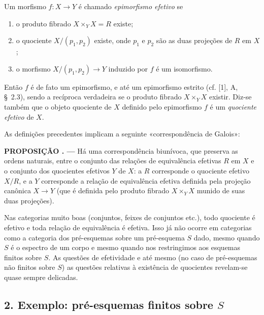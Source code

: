 \documentclass[11pt,twoside,openany]{book}
\numberwithin{equation}{section}
\newcommand{\src}[1]{%
  \phantomsection\hypertarget{src:#1}{}%
  \marginpar{\raggedleft\footnotesize\sffamily #1}%
}
\theoremstyle{plain}
\theoremstyle{definition}
\theoremstyle{remark}
\newcommand{\result}[2]{%
  \par\medskip\noindent\textbf{#1%
  \if\relax\detokenize{#2}\relax\else\space#2\fi. ---}\enspace
}
\newcommand{\FgaUnitKey}{frontmatter}
\renewcommand{\src}[1]{%
  \phantomsection\hypertarget{src:\FgaUnitKey:#1}{}%
  \marginpar{\raggedleft\footnotesize\sffamily #1}%
}
\begin{document}
Um morfismo $f:X\longrightarrow Y$ é chamado \emph{epimorfismo efetivo} se
\begin{enumerate}
  \item[(i)] o produto fibrado $X\times_Y X=R$ existe;
  \item[(ii)] o quociente $X/(p_1,p_2)$ existe, onde $p_1$ e $p_2$ são as duas
  projeções de $R$ em $X$;
  \item[(iii)] o morfismo $X/(p_1,p_2)\longrightarrow Y$ induzido por $f$ é um
  isomorfismo.
\end{enumerate}
Então $f$ é de fato um epimorfismo, e até um epimorfismo estrito (cf. [1], A,
\S~2.3), sendo a recíproca verdadeira se o produto fibrado $X\times_Y X$
existir. Diz-se também que o objeto quociente de $X$ definido pelo epimorfismo
$f$ é um \emph{quociente efetivo} de $X$.

As definições precedentes implicam a seguinte «correspondência de Galois»:
\src{102}
\result{PROPOSIÇÃO}{1.1} Há uma correspondência biunívoca, que preserva as
ordens naturais, entre o conjunto das relações de equivalência efetivas $R$
em $X$ e o conjunto dos quocientes efetivos $Y$ de $X$: a $R$ corresponde o
quociente efetivo $X/R$, e a $Y$ corresponde a relação de equivalência efetiva
definida pela projeção canônica $X\longrightarrow Y$ (que é definida pelo
produto fibrado $X\times_Y X$ munido de suas duas projeções).

Nas categorias muito boas (conjuntos, feixes de conjuntos etc.), todo
quociente é efetivo e toda relação de equivalência é efetiva. Isso já não
ocorre em categorias como a categoria dos pré-esquemas sobre um pré-esquema
$S$ dado, mesmo quando $S$ é o espectro de um corpo e mesmo quando nos
restringimos aos esquemas finitos sobre $S$. As questões de efetividade e até
mesmo (no caso de pré-esquemas não finitos sobre $S$) as questões relativas à
existência de quocientes revelam-se quase sempre delicadas.

\subsection*{2. Exemplo: pré-esquemas finitos sobre $S$}
\end{document}
